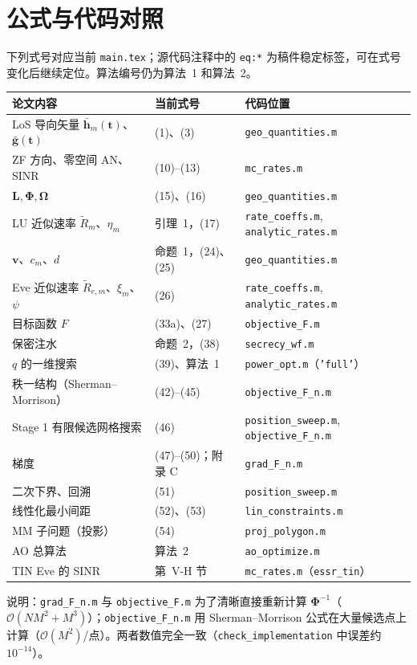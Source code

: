 \documentclass[11pt,a4paper]{ctexart}
\newcommand{\code}[1]{\texttt{#1}}
\newcommand{\bt}{\mathbf t}
\begin{document}
\section{公式与代码对照}
\noindent 下列式号对应当前 \code{main.tex}；源代码注释中的 \code{eq:*} 为稿件稳定标签，可在式号变化后继续定位。算法编号仍为算法~1 和算法~2。
\begin{longtable}{p{5.6cm}p{3.6cm}p{6.2cm}}
\toprule
论文内容 & 当前式号 & 代码位置 \\ \midrule
LoS 导向矢量 $\bar{\mathbf h}_m(\bt)$、$\bar{\mathbf g}(\bt)$ & (1)、(3) & \code{geo\_quantities.m} \\
ZF 方向、零空间 AN、SINR & (10)--(13) & \code{mc\_rates.m} \\
$\mathbf L,\boldsymbol\Phi,\boldsymbol\Omega$ & (15)、(16) & \code{geo\_quantities.m} \\
LU 近似速率 $\tilde R_m$、$\eta_m$ & 引理~1，(17) & \code{rate\_coeffs.m}, \code{analytic\_rates.m} \\
$\mathbf v$、$c_m$、$d$ & 命题~1，(24)、(25) & \code{geo\_quantities.m} \\
Eve 近似速率 $\tilde R_{e,m}$、$\xi_m$、$\psi$ & (26) & \code{rate\_coeffs.m}, \code{analytic\_rates.m} \\
目标函数 $F$ & (33a)、(27) & \code{objective\_F.m} \\
保密注水 & 命题~2，(38) & \code{secrecy\_wf.m} \\
$q$ 的一维搜索 & (39)、算法~1 & \code{power\_opt.m}（\code{'full'}）\\
秩一结构（Sherman--Morrison）& (42)--(45) & \code{objective\_F\_n.m} \\
Stage 1 有限候选网格搜索 & (46) & \code{position\_sweep.m}, \code{objective\_F\_n.m} \\
梯度 & (47)--(50)；附录 C & \code{grad\_F\_n.m} \\
二次下界、回溯 & (51) & \code{position\_sweep.m} \\
线性化最小间距 & (52)、(53) & \code{lin\_constraints.m} \\
MM 子问题（投影） & (54) & \code{proj\_polygon.m} \\
AO 总算法 & 算法~2 & \code{ao\_optimize.m} \\
TIN Eve 的 SINR & 第~V-H 节 & \code{mc\_rates.m}（\code{essr\_tin}）\\
\bottomrule
\end{longtable}
\noindent 说明：\code{grad\_F\_n.m} 与 \code{objective\_F.m} 为了清晰直接重新计算 $\boldsymbol\Phi^{-1}$（$\mathcal O(NM^2+M^3)$）；\code{objective\_F\_n.m} 用 Sherman--Morrison 公式在大量候选点上计算（$\mathcal O(M^2)$/点）。两者数值完全一致（\code{check\_implementation} 中误差约 $10^{-14}$）。
\end{document}
